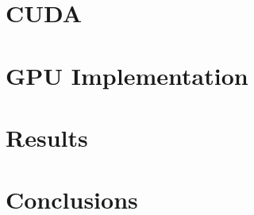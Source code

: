 \documentclass[a4paper,11pt]{kth-mag}
\begin{document}
\chapter{CUDA}
\chapter{GPU Implementation}
\chapter{Results}



\chapter{Conclusions}

\appendix
\addappheadtotoc
\end{document}
